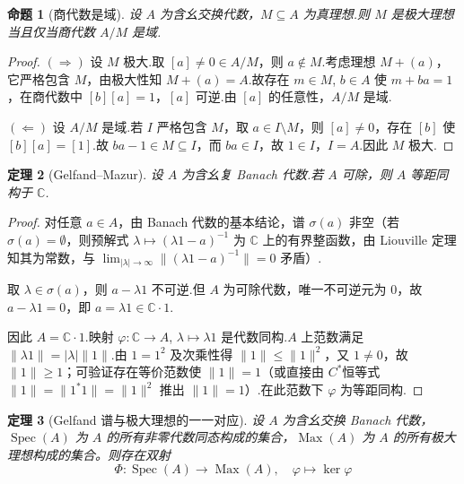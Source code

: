 \documentclass{ctexart}
\newtheorem{theorem}{定理}[section]
\newtheorem{proposition}[theorem]{命题}
\theoremstyle{plain}
\newtheorem*{proof}{证明}
\theoremstyle{plain}
\DeclareMathOperator{\Spec}{Spec}
\begin{document}
\begin{proposition}[商代数是域]\label{prop:quotient-maximal}
    设 $A$ 为含幺交换代数，$M \subseteq A$ 为真理想.则 $M$ 是极大理想当且仅当商代数 $A/M$ 是域.
\end{proposition}

\begin{proof}
    $(\Rightarrow)$ 设 $M$ 极大.取 $[a] \neq 0 \in A/M$，则 $a \notin M$.考虑理想 $M + (a)$，它严格包含 $M$，由极大性知 $M + (a) = A$.故存在 $m \in M$, $b \in A$ 使 $m + ba = 1$，在商代数中 $[b][a] = 1$，$[a]$ 可逆.由 $[a]$ 的任意性，$A/M$ 是域.

    $(\Leftarrow)$ 设 $A/M$ 是域.若 $I$ 严格包含 $M$，取 $a \in I \setminus M$，则 $[a] \neq 0$，存在 $[b]$ 使 $[b][a] = [1]$.故 $ba - 1 \in M \subseteq I$，而 $ba \in I$，故 $1 \in I$，$I = A$.因此 $M$ 极大.
\end{proof}

\begin{theorem}[Gelfand--Mazur]\label{thm:gelfand-mazur}
    设 $A$ 为含幺复 Banach 代数.若 $A$ 可除，则 $A$ 等距同构于 $\mathbb{C}$.
\end{theorem}

\begin{proof}
    对任意 $a \in A$，由 Banach 代数的基本结论，谱 $\sigma(a)$ 非空（若 $\sigma(a) = \emptyset$，则预解式 $\lambda \mapsto (\lambda 1 - a)^{-1}$ 为 $\mathbb{C}$ 上的有界整函数，由 Liouville 定理知其为常数，与 $\lim_{|\lambda|\to\infty} \|(\lambda 1 - a)^{-1}\| = 0$ 矛盾）.

    取 $\lambda \in \sigma(a)$，则 $a - \lambda 1$ 不可逆.但 $A$ 为可除代数，唯一不可逆元为 $0$，故 $a - \lambda 1 = 0$，即 $a = \lambda 1 \in \mathbb{C}\cdot 1$.

    因此 $A = \mathbb{C}\cdot 1$.映射 $\varphi: \mathbb{C} \to A$, $\lambda \mapsto \lambda 1$ 是代数同构.$A$ 上范数满足 $\|\lambda 1\| = |\lambda|\|1\|$.由 $1 = 1^2$ 及次乘性得 $\|1\| \le \|1\|^2$，又 $1 \neq 0$，故 $\|1\| \ge 1$；可验证存在等价范数使 $\|1\| = 1$（或直接由 $C^*$恒等式 $\|1\| = \|1^*1\| = \|1\|^2$ 推出 $\|1\| = 1$）.在此范数下 $\varphi$ 为等距同构.
\end{proof}
\begin{theorem}[Gelfand 谱与极大理想的一一对应]\label{thm:spec-maximal-ideal}
    设 $A$ 为含幺交换 Banach 代数，$\Spec(A)$ 为 $A$ 的所有非零代数同态构成的集合，$\operatorname{Max}(A)$ 为 $A$ 的所有极大理想构成的集合。则存在双射
    \begin{equation}
        \Phi: \Spec(A) \longrightarrow \operatorname{Max}(A), \quad \varphi \longmapsto \ker\varphi
    \end{equation}
\end{theorem}
\end{document}
